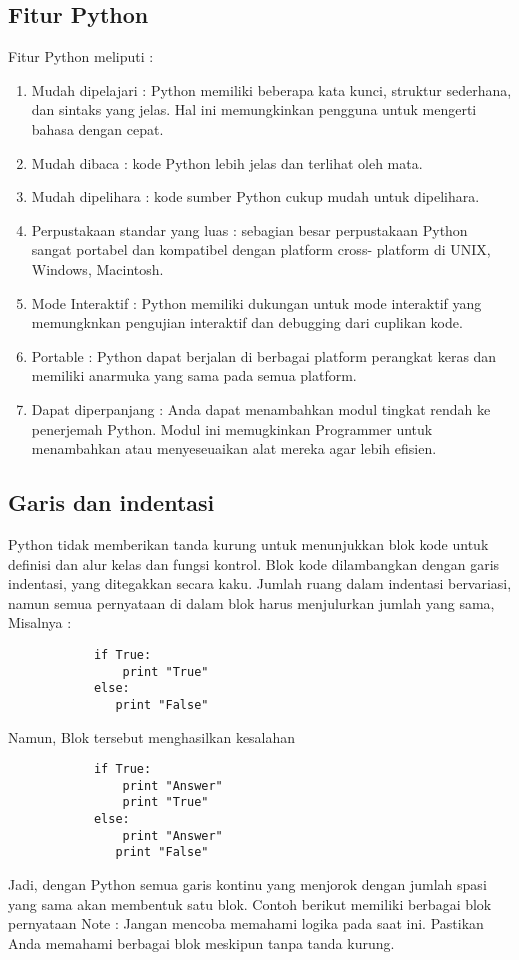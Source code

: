 \subsection{Fitur Python}
Fitur Python meliputi :
    \begin{enumerate}
        \item Mudah dipelajari : Python memiliki beberapa kata kunci, struktur sederhana, dan sintaks yang jelas. Hal ini memungkinkan
        pengguna untuk mengerti bahasa dengan cepat.
        \item Mudah dibaca : kode Python lebih jelas dan terlihat oleh mata.
        \item Mudah dipelihara : kode sumber Python cukup mudah untuk dipelihara.
        \item Perpustakaan standar yang luas : sebagian besar perpustakaan Python sangat portabel dan kompatibel dengan platform cross-           platform di UNIX, Windows, Macintosh.
        \item Mode Interaktif : Python memiliki dukungan untuk mode interaktif yang memungknkan pengujian interaktif dan debugging dari         cuplikan kode.
        \item Portable : Python dapat berjalan di berbagai platform perangkat keras dan memiliki anarmuka yang sama pada semua platform.
        \item Dapat diperpanjang : Anda dapat menambahkan modul tingkat rendah ke penerjemah Python. Modul ini memugkinkan Programmer            untuk menambahkan atau menyeseuaikan alat mereka agar lebih efisien.
     \end{enumerate}

\subsection{Garis dan indentasi}
Python tidak memberikan tanda kurung untuk menunjukkan blok kode untuk definisi dan alur kelas dan fungsi
kontrol. Blok kode dilambangkan dengan garis indentasi, yang ditegakkan secara kaku.
Jumlah ruang dalam indentasi bervariasi, namun semua pernyataan di dalam blok harus
menjulurkan jumlah yang sama, Misalnya :
    \begin{verbatim}
            if True:
                print "True"
            else:
               print "False"
    \end{verbatim}
    
Namun, Blok tersebut menghasilkan kesalahan
    \begin{verbatim}
            if True:
                print "Answer"
                print "True"
            else:
                print "Answer"
               print "False"
    \end{verbatim}
Jadi, dengan Python semua garis kontinu yang menjorok dengan jumlah spasi yang sama akan membentuk satu blok. Contoh berikut memiliki berbagai blok pernyataan
Note : Jangan mencoba memahami logika pada saat ini. Pastikan Anda memahami berbagai blok meskipun tanpa tanda kurung.


